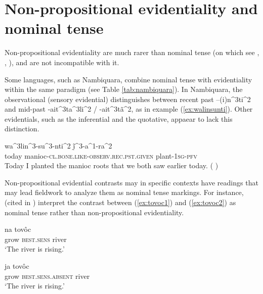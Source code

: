 \documentclass[oneside,a4paper,11pt]{article}
\newcommand{\ipa}[1]{{\phon \mbox{#1}}} %
\begin{document}
\section{Non-propositional evidentiality and nominal tense}

Non-propositional evidentiality are much rarer than nominal tense (on which see \citealt{nordlinger04nominal}, \citealt{haude04tense}, \citealt[132]{francois05overview}), and are not incompatible with it.


Some languages, such as Nambiquara, combine nominal tense with evidentiality within the same paradigm (see Table \ref{tab:nambiquara}). In Nambiquara,  the observational (sensory evidential)  distinguishes between recent past \ipa{--(i)n^3ti^2} and mid-past \ipa{-ait^3ta^3li^2} /
\ipa{-ait^3tã^2}, as in example (\ref{ex:walinsunti}). Other evidentials, such as the inferential and the quotative, appaear to lack this distinction.

\begin{exe}
\ex \label{ex:walinsunti}
\gll  \ipa{hĩ^1na^2su^2} \ipa{wa^3lin^3-su^3-nti^2} \ipa{ḭ̃^3-a^1-ra^2} \\
today manioc-\textsc{cl.bone.like-observ.rec.pst.given} plant-\textsc{1sg-pfv} \\
\glt Today I planted the manioc roots that we both saw earlier today. (\citealt[290, ex 62.]{lowe99nambiquara} ) 
  \end{exe}

Non-propositional evidential contrasts may in specific contexts have readings that may lead fieldwork to analyze them as nominal tense markings. For instance, \citet[631]{campbell12chaco} (cited in \citealt{gutierrez14determiners}) interpret the contrast between (\ref{ex:tovoc1}) and (\ref{ex:tovoc2}) as nominal tense rather than non-propositional evidentiality.

\begin{exe}
\ex \label{ex:tovoc1}
\gll \ipa{tsej} \ipa{na} \ipa{tovôc} \\
  grow \textsc{best.sens} river \\
\glt `The river is rising.'
\end{exe}


\begin{exe}
\ex \label{ex:tovoc2}
\gll \ipa{tsej} \ipa{ja} \ipa{tovôc} \\
 grow \textsc{best.sens.absent} river \\
\glt `The river is rising.'
\end{exe}
\end{document}
